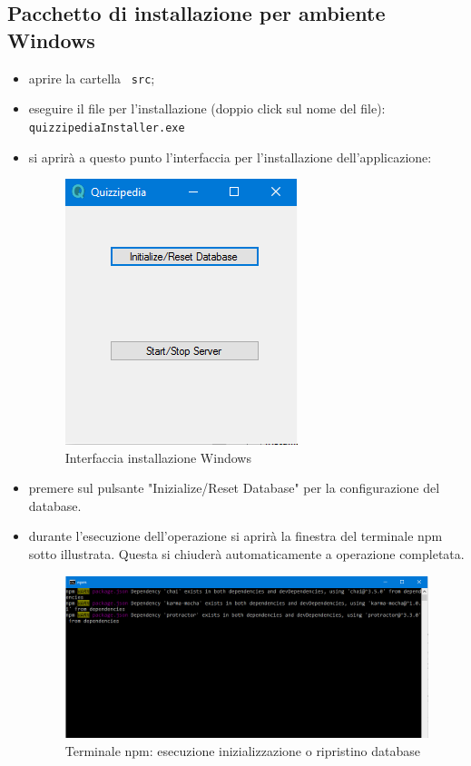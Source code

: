 \documentclass[12pt,a4paper]{article}
\begin{document}
		\subsection{Pacchetto di installazione per ambiente Windows}
		\begin{itemize}
			\item aprire la cartella \texttt{ src};
			\item eseguire il file per l'installazione (doppio click sul nome del file): \texttt{quizzipediaInstaller.exe}
			\item si aprirà a questo punto l'interfaccia per l'installazione dell'applicazione:
			\begin{figure}[H]	
				\centering
				\includegraphics[width=0.4\linewidth]{../img/manualeInstallazione/win_installer01.png}
				\caption{Interfaccia installazione Windows}
				\label{Interfaccia installazione Windows}
			\end{figure}
			
			\item premere sul pulsante "Inizialize/Reset Database" per la configurazione del database. 
			\item durante l'esecuzione dell'operazione si aprirà la finestra del terminale npm sotto illustrata. Questa si chiuderà automaticamente a operazione completata.
			\begin{figure}[H]	
				\centering
				\includegraphics[width=0.8\linewidth]{../img/manualeInstallazione/win_installer02.png}
				\caption{Terminale npm: esecuzione inizializzazione o ripristino database}
				\label{Terminale npm: esecuzione inizializzazione o ripristino database}
			\end{figure}
			

\end{itemize}
\end{document}
